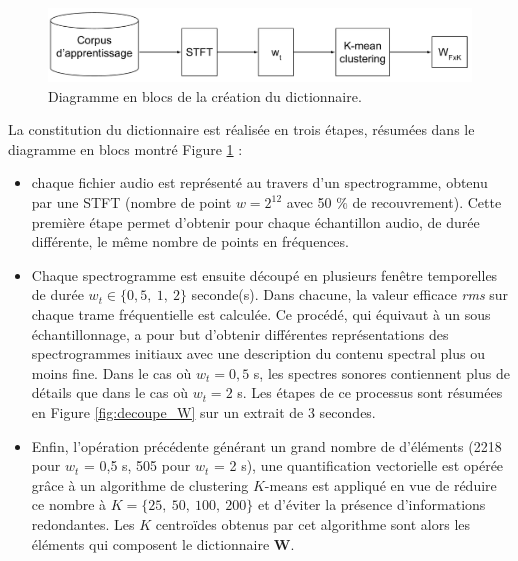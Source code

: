 \begin{figure}[hbtp]
\centering
\includegraphics[width=.9\linewidth]{./figures/NMF/creation_dictionaire.pdf}
\caption{Diagramme en blocs de la création du dictionnaire.}
\label{fig:creation_W}
\end{figure}

La constitution du dictionnaire est réalisée en trois étapes, résumées dans le diagramme en blocs montré Figure \ref{fig:creation_W} :
\begin{itemize}
\item chaque fichier audio est représenté au travers d'un spectrogramme, obtenu par une STFT (nombre de point $w = 2^{12}$ avec 50 $\%$ de recouvrement). Cette première étape permet d'obtenir pour chaque échantillon audio, de durée différente, le même nombre de points en fréquences.
\item Chaque spectrogramme est ensuite découpé en plusieurs fenêtre temporelles de durée $w_t \in \lbrace 0,5,~ 1,~ 2\rbrace$ seconde(s). 
Dans chacune, la valeur efficace \textit{rms} sur chaque trame fréquentielle est calculée. Ce procédé, qui équivaut à un sous échantillonnage, a pour but d'obtenir différentes représentations des spectrogrammes initiaux avec une description du contenu spectral plus ou moins fine. Dans le cas où $w_t = 0,5$ s, les spectres sonores contiennent plus de détails que dans le cas où $w_t = 2$ s. Les étapes de ce processus sont résumées en Figure \ref{fig:decoupe_W} sur un extrait de 3 secondes.
\item Enfin, l'opération précédente générant un grand nombre de d'éléments (2218 pour $w_t$ = 0,5 s, 505 pour $w_t$ = 2 s), une quantification vectorielle est opérée grâce à un algorithme de clustering $K$-means est appliqué en vue de réduire ce nombre à $K = \lbrace 25,~50,~100,~200 \rbrace$ et d'éviter la présence d'informations redondantes. Les $K$ centroïdes obtenus par cet algorithme sont alors les éléments qui composent le dictionnaire $\mathbf{W}$.
\end{itemize}

